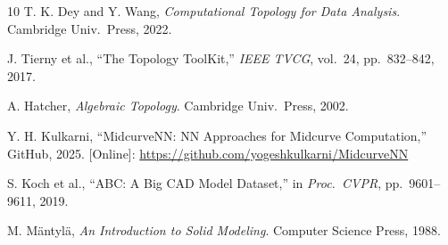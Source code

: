 \documentclass[journal,twocolumn,10pt]{IEEEtran}
\begin{document}
\begin{thebibliography}{10}
T. K. Dey and Y. Wang,
\emph{Computational Topology for Data Analysis}.
Cambridge Univ.\ Press, 2022.

J. Tierny et al., ``The Topology ToolKit,''
\emph{IEEE TVCG}, vol.~24, pp.~832--842, 2017.

A. Hatcher, \emph{Algebraic Topology}.
Cambridge Univ.\ Press, 2002.

Y. H. Kulkarni, ``MidcurveNN: NN Approaches for Midcurve Computation,''
GitHub, 2025. [Online]:
\url{https://github.com/yogeshkulkarni/MidcurveNN}

S. Koch et al., ``ABC: A Big CAD Model Dataset,''
in \emph{Proc.\ CVPR}, pp.~9601--9611, 2019.

M. M\"antyl\"a, \emph{An Introduction to Solid Modeling}.
Computer Science Press, 1988.

\end{thebibliography}
\end{document}
